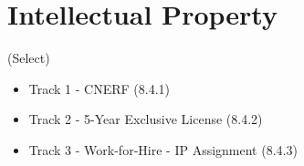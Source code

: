 \section{Intellectual Property}
{\color{red}(Select)}
\begin{itemize}
    \item Track 1 - CNERF (8.4.1)
    \item Track 2 - 5-Year Exclusive License (8.4.2)
    \item Track 3 - Work-for-Hire - IP Assignment (8.4.3)
\end{itemize}

